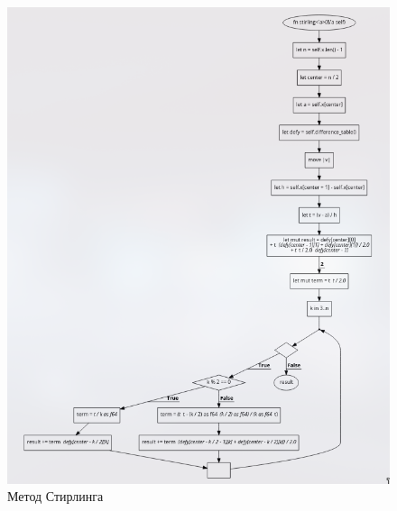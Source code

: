 \documentclass{article}
\begin{document}
                \begin{figure}[H]
                      \centering
                      \includegraphics[width=360pt]{alg4.png}
                      \caption[Схема-1]{Метод Стирлинга}
                      \label{fig:screenshot004}
                \end{figure} 
\end{document}

